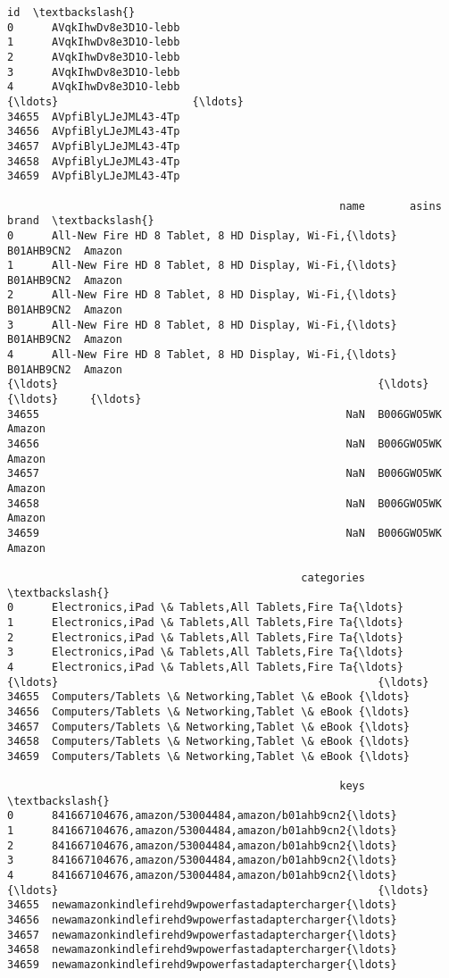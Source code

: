 \documentclass[11pt]{article}
\begin{document}
    \begin{Verbatim}[commandchars=\\\{\}]
                         id  \textbackslash{}
0      AVqkIhwDv8e3D1O-lebb
1      AVqkIhwDv8e3D1O-lebb
2      AVqkIhwDv8e3D1O-lebb
3      AVqkIhwDv8e3D1O-lebb
4      AVqkIhwDv8e3D1O-lebb
{\ldots}                     {\ldots}
34655  AVpfiBlyLJeJML43-4Tp
34656  AVpfiBlyLJeJML43-4Tp
34657  AVpfiBlyLJeJML43-4Tp
34658  AVpfiBlyLJeJML43-4Tp
34659  AVpfiBlyLJeJML43-4Tp

                                                    name       asins   brand  \textbackslash{}
0      All-New Fire HD 8 Tablet, 8 HD Display, Wi-Fi,{\ldots}  B01AHB9CN2  Amazon
1      All-New Fire HD 8 Tablet, 8 HD Display, Wi-Fi,{\ldots}  B01AHB9CN2  Amazon
2      All-New Fire HD 8 Tablet, 8 HD Display, Wi-Fi,{\ldots}  B01AHB9CN2  Amazon
3      All-New Fire HD 8 Tablet, 8 HD Display, Wi-Fi,{\ldots}  B01AHB9CN2  Amazon
4      All-New Fire HD 8 Tablet, 8 HD Display, Wi-Fi,{\ldots}  B01AHB9CN2  Amazon
{\ldots}                                                  {\ldots}         {\ldots}     {\ldots}
34655                                                NaN  B006GWO5WK  Amazon
34656                                                NaN  B006GWO5WK  Amazon
34657                                                NaN  B006GWO5WK  Amazon
34658                                                NaN  B006GWO5WK  Amazon
34659                                                NaN  B006GWO5WK  Amazon

                                              categories  \textbackslash{}
0      Electronics,iPad \& Tablets,All Tablets,Fire Ta{\ldots}
1      Electronics,iPad \& Tablets,All Tablets,Fire Ta{\ldots}
2      Electronics,iPad \& Tablets,All Tablets,Fire Ta{\ldots}
3      Electronics,iPad \& Tablets,All Tablets,Fire Ta{\ldots}
4      Electronics,iPad \& Tablets,All Tablets,Fire Ta{\ldots}
{\ldots}                                                  {\ldots}
34655  Computers/Tablets \& Networking,Tablet \& eBook {\ldots}
34656  Computers/Tablets \& Networking,Tablet \& eBook {\ldots}
34657  Computers/Tablets \& Networking,Tablet \& eBook {\ldots}
34658  Computers/Tablets \& Networking,Tablet \& eBook {\ldots}
34659  Computers/Tablets \& Networking,Tablet \& eBook {\ldots}

                                                    keys  \textbackslash{}
0      841667104676,amazon/53004484,amazon/b01ahb9cn2{\ldots}
1      841667104676,amazon/53004484,amazon/b01ahb9cn2{\ldots}
2      841667104676,amazon/53004484,amazon/b01ahb9cn2{\ldots}
3      841667104676,amazon/53004484,amazon/b01ahb9cn2{\ldots}
4      841667104676,amazon/53004484,amazon/b01ahb9cn2{\ldots}
{\ldots}                                                  {\ldots}
34655  newamazonkindlefirehd9wpowerfastadaptercharger{\ldots}
34656  newamazonkindlefirehd9wpowerfastadaptercharger{\ldots}
34657  newamazonkindlefirehd9wpowerfastadaptercharger{\ldots}
34658  newamazonkindlefirehd9wpowerfastadaptercharger{\ldots}
34659  newamazonkindlefirehd9wpowerfastadaptercharger{\ldots}


\end{Verbatim}
\end{document}
